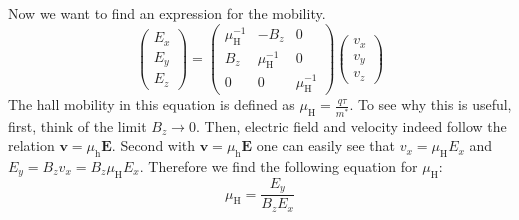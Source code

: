 Now we want to find an expression for the mobility.
\begin{equation}
	\begin{pmatrix}
		E_{x} \\
		E_{y} \\
		E_{z}
	\end{pmatrix}
	=\begin{pmatrix}
		\mu_\mathrm{H}^{-1} & -B_{z}              & 0                   \\
		B_{z}               & \mu_\mathrm{H}^{-1} & 0                   \\
		0                   & 0                   & \mu_\mathrm{H}^{-1}
	\end{pmatrix}
	\begin{pmatrix}
		v_{x} \\
		v_{y} \\
		v_{z}
	\end{pmatrix}
\end{equation}
The hall mobility in this equation is defined as $\mu_{\mathrm{H}}=\frac{q\tau}{m^{*}}$.
To see why this is useful, first, think of the limit $B_{z}\to 0$.
Then, electric field and velocity indeed follow the relation $\mathbf{v}=\mu_{\mathrm{h}}\mathbf{E}$.
Second with $\mathbf{v}=\mu_{\mathrm{h}}\mathbf{E}$ one can easily see that
$v_{x} = \mu_{\mathrm{H}}E_{x}$ and $E_{y}=B_{z}v_{x}=B_{z}\mu_{\mathrm{H}}E_{x}$.
Therefore we find the following equation for $\mu_\mathrm{H}$:
\begin{equation}
	\mu_{\mathrm{H}}=\frac{E_{y}}{B_{z}E_{x}}
\end{equation}
